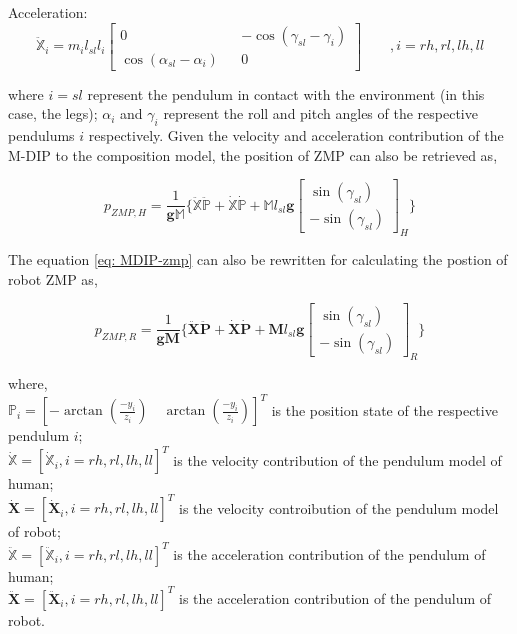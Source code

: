 Acceleration:
\begin{equation}
    \label{eq: MDIP-acceleration}
    \ddot{\mathbb{X}}_i = m_il_{sl}l_i\begin{bmatrix}
        0 && -\cos(\gamma_{sl} - \gamma_i) \\
        \cos(\alpha_{sl} - \alpha_i) && 0
    \end{bmatrix} \qquad \mathit{,i = rh, rl, lh, ll}
\end{equation}

where $i=sl$ represent the pendulum in contact with the environment (in this case, the legs); $\alpha_i$ and $\gamma_i$
represent the roll and pitch angles of the respective pendulums $i$ respectively. Given the velocity and acceleration contribution of the M-DIP to the composition model, the position of ZMP can also be retrieved
as, 

\begin{equation}
    \label{eq: MDIP-zmp}
    p_{ZMP, H} = \frac{1}{\mathbf{g}\mathbb{M}}\{\mathbb{\ddot{X}}\mathbb{\ddot{P}} + \mathbb{\dot{X}}\mathbb{\dot{P}} + \mathbb{M}l_{sl}\mathbf{g}\begin{bmatrix}
        \sin(\gamma_{sl}) \\
        -\sin(\gamma_{sl})
    \end{bmatrix}_{H}\}
\end{equation}

The equation \ref{eq: MDIP-zmp} can also be rewritten for calculating the postion of robot ZMP as,

\begin{equation}
    \label{eq: MDIP-robot-zmp}
    p_{ZMP, R} = \frac{1}{\mathbf{g}\mathbf{M}}\{\mathbf{\ddot{X}}\mathbf{\ddot{P}} + \mathbf{\dot{X}}\mathbf{\dot{P}} + \mathbf{M}l_{sl}\mathbf{g}\begin{bmatrix}
        \sin(\gamma_{sl}) \\
        -\sin(\gamma_{sl})
    \end{bmatrix}_{R}\}
\end{equation}

where,
\\
$\mathbb{P}_{i} = [-\arctan(\frac{-y_i}{z_i}) \quad \arctan(\frac{-y_i}{z_i})]^T$ is the position state of the respective pendulum $i$; \\
$\mathbb{\dot{X}} = [\mathbb{\dot{X}}_i, \mathit{i = rh, rl, lh, ll}]^T$ is the velocity contribution of the pendulum model of human; \\
$\mathbf{\dot{X}} = [\mathbf{\dot{X}}_i, \mathit{i = rh, rl, lh, ll}]^T$ is the velocity controibution of the pendulum model of robot; \\
$\mathbb{\ddot{X}} = [\mathbb{\ddot{X}}_i, \mathit{i = rh, rl, lh, ll}]^T$ is the acceleration contribution of the pendulum of human; \\
$\mathbf{\ddot{X}} = [\mathbf{\ddot{X}}_i, \mathit{i = rh, rl, lh, ll}]^T$ is the acceleration contribution of the pendulum of robot.

